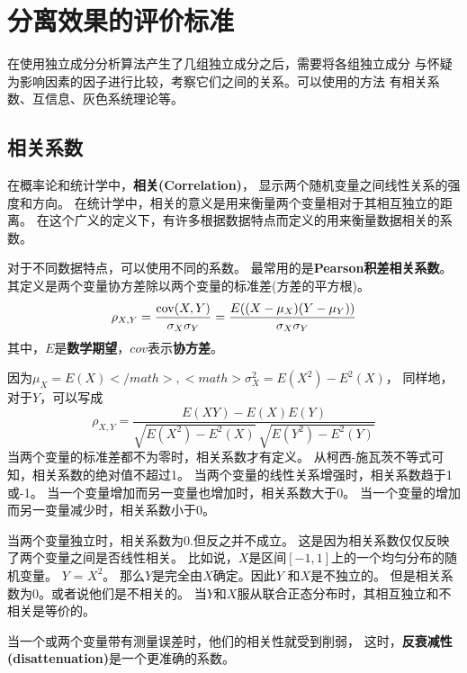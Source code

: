 ﻿%

\chapter{分离效果的评价标准}

\label{chap03}

在使用独立成分分析算法产生了几组独立成分之后，需要将各组独立成分
与怀疑为影响因素的因子进行比较，考察它们之间的关系。可以使用的方法
有相关系数、互信息、灰色系统理论等。
 
\section{相关系数\cite{PEARSON}}
在概率论和统计学中，\textbf{相关(Correlation)}，
显示两个随机变量之间线性关系的强度和方向。
在统计学中，相关的意义是用来衡量两个变量相对于其相互独立的距离。
在这个广义的定义下，有许多根据数据特点而定义的用来衡量数据相关的系数。

对于不同数据特点，可以使用不同的系数。
最常用的是\textbf{Pearson积差相关系数}。
其定义是两个变量协方差除以两个变量的标准差(方差的平方根)。
\begin{equation}
\rho_{X,Y} = {\mathrm{cov}(X,Y) \over \sigma_X \sigma_Y} 
           = {E((X-\mu_X)(Y-\mu_Y)) \over \sigma_X\sigma_Y}
\end{equation}
其中，$E$是\textbf{数学期望}，$cov$表示\textbf{协方差}。

因为$\mu_X = E(X)</math>, <math>\sigma_X^2 = E(X^2) - E^2(X)$，
同样地，对于$Y$，可以写成
\begin{equation}
\rho_{X,Y} = 
       \frac{E(XY)-E(X)E(Y)}
            {\sqrt{E(X^2)-E^2(X)}~\sqrt{E(Y^2)-E^2(Y)}}
\end{equation}
当两个变量的标准差都不为零时，相关系数才有定义。
从柯西-施瓦茨不等式可知，相关系数的绝对值不超过1。
当两个变量的线性关系增强时，相关系数趋于1或-1。
当一个变量增加而另一变量也增加时，相关系数大于0。
当一个变量的增加而另一变量减少时，相关系数小于0。

当两个变量独立时，相关系数为0.但反之并不成立。 
这是因为相关系数仅仅反映了两个变量之间是否线性相关。
比如说，$X$是区间$[-1, 1]$上的一个均匀分布的随机变量。
$Y$ = $X^2$。 那么$Y$是完全由$X$确定。因此$Y$ 和$X$是不独立的。
但是相关系数为0。或者说他们是不相关的。
当$Y$和$X$服从联合正态分布时，其相互独立和不相关是等价的。

当一个或两个变量带有测量误差时，他们的相关性就受到削弱，
这时，\textbf{反衰减性(disattenuation)}是一个更准确的系数。


